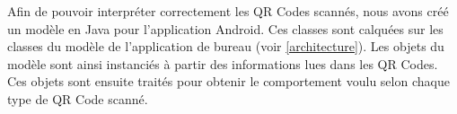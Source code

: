 Afin de pouvoir interpréter correctement les QR Codes scannés, nous avons créé un modèle en Java pour l'application Android. Ces classes sont calquées sur les classes du modèle de l'application de bureau (voir \ref{architecture}). Les objets du modèle sont ainsi instanciés à partir des informations lues dans les QR Codes. Ces objets sont ensuite traités pour obtenir le comportement voulu selon chaque type de QR Code scanné.